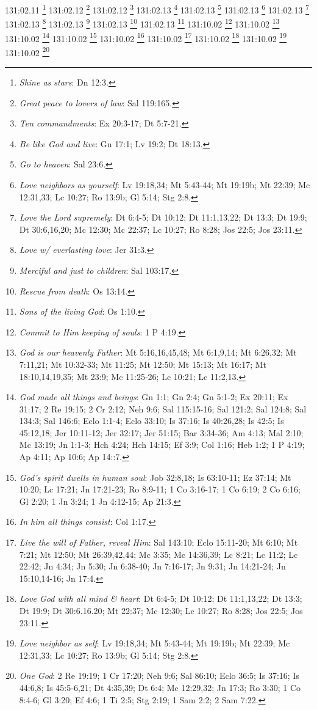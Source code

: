 {{{{{{{{{{{{{{{{{{{{{{{{{{{{{{131:02.11 \footnote{\textit{Shine as stars}: Dn 12:3.}
131:02.12 \footnote{\textit{Great peace to lovers of law}: Sal 119:165.}
131:02.12 \footnote{\textit{Ten commandments}: Ex 20:3-17; Dt 5:7-21.}
131:02.13 \footnote{\textit{Be like God and live}: Gn 17:1; Lv 19:2; Dt 18:13.}
131:02.13 \footnote{\textit{Go to heaven}: Sal 23:6.}
131:02.13 \footnote{\textit{Love neighbors as yourself}: Lv 19:18,34; Mt 5:43-44; Mt 19:19b; Mt 22:39; Mc 12:31,33; Lc 10:27; Ro 13:9b; Gl 5:14; Stg 2:8.}
131:02.13 \footnote{\textit{Love the Lord supremely}: Dt 6:4-5; Dt 10:12; Dt 11:1,13,22; Dt 13:3; Dt 19:9; Dt 30:6,16,20; Mc 12:30; Mc 22:37; Lc 10:27; Ro 8:28; Jos 22:5; Jos 23:11.}
131:02.13 \footnote{\textit{Love w/ everlasting love}: Jer 31:3.}
131:02.13 \footnote{\textit{Merciful and just to children}: Sal 103:17.}
131:02.13 \footnote{\textit{Rescue from death}: Os 13:14.}
131:02.13 \footnote{\textit{Sons of the living God}: Os 1:10.}
131:10.02 \footnote{\textit{Commit to Him keeping of souls}: 1 P 4:19.}
131:10.02 \footnote{\textit{God is our heavenly Father}: Mt 5:16,16,45,48; Mt 6:1,9,14; Mt 6:26,32; Mt 7:11,21; Mt 10:32-33; Mt 11:25; Mt 12:50; Mt 15:13; Mt 16:17; Mt 18:10,14,19,35; Mt 23:9; Mc 11:25-26; Lc 10:21; Lc 11:2,13.}
131:10.02 \footnote{\textit{God made all things and beings}: Gn 1:1; Gn 2:4; Gn 5:1-2; Ex 20:11; Ex 31:17; 2 Re 19:15; 2 Cr 2:12; Neh 9:6; Sal 115:15-16; Sal 121:2; Sal 124:8; Sal 134:3; Sal 146:6; Eclo 1:1-4; Eclo 33:10; Is 37:16; Is 40:26,28; Is 42:5; Is 45:12,18; Jer 10:11-12; Jer 32:17; Jer 51:15; Bar 3:34-36; Am 4:13; Mal 2:10; Mc 13:19; Jn 1:1-3; Hch 4:24; Hch 14:15; Ef 3:9; Col 1:16; Heb 1:2; 1 P 4:19; Ap 4:11; Ap 10:6; Ap 14::7.}
131:10.02 \footnote{\textit{God's spirit dwells in human soul}: Job 32:8,18; Is 63:10-11; Ez 37:14; Mt 10:20; Lc 17:21; Jn 17:21-23; Ro 8:9-11; 1 Co 3:16-17; 1 Co 6:19; 2 Co 6:16; Gl 2:20; 1 Jn 3:24; 1 Jn 4:12-15; Ap 21:3.}
131:10.02 \footnote{\textit{In him all things consist}: Col 1:17.}
131:10.02 \footnote{\textit{Live the will of Father, reveal Him}: Sal 143:10; Eclo 15:11-20; Mt 6:10; Mt 7:21; Mt 12:50; Mt 26:39,42,44; Mc 3:35; Mc 14:36,39; Lc 8:21; Lc 11:2; Lc 22:42; Jn 4:34; Jn 5:30; Jn 6:38-40; Jn 7:16-17; Jn 9:31; Jn 14:21-24; Jn 15:10,14-16; Jn 17:4.}
131:10.02 \footnote{\textit{Love God with all mind & heart}: Dt 6:4-5; Dt 10:12; Dt 11:1,13,22; Dt 13:3; Dt 19:9; Dt 30:6.16.20; Mt 22:37; Mc 12:30; Lc 10:27; Ro 8:28; Jos 22:5; Jos 23:11.}
131:10.02 \footnote{\textit{Love neighbor as self}: Lv 19:18,34; Mt 5:43-44; Mt 19:19b; Mt 22:39; Mc 12:31,33; Lc 10:27; Ro 13:9b; Gl 5:14; Stg 2:8.}
131:10.02 \footnote{\textit{One God}: 2 Re 19:19; 1 Cr 17:20; Neh 9:6; Sal 86:10; Eclo 36:5; Is 37:16; Is 44:6,8; Is 45:5-6,21; Dt 4:35,39; Dt 6:4; Mc 12:29,32; Jn 17:3; Ro 3:30; 1 Co 8:4-6; Gl 3:20; Ef 4:6; 1 Ti 2:5; Stg 2:19; 1 Sam 2:2; 2 Sam 7:22.}
}}}}}}}}}}}}}}}}}}}}}}}}}}}}}}
